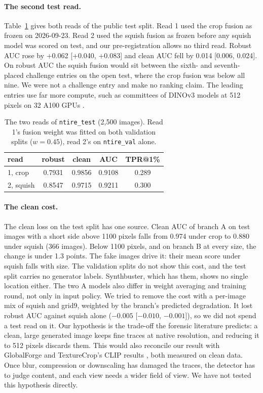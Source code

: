 \documentclass[letterpaper]{article} %
\begin{document}
\paragraph{The second test read.} Table~\ref{tab:test} gives both reads of
the public test split. Read 1 used the crop fusion as frozen on 2026-09-23.
Read 2 used the squish fusion as frozen before any squish model was scored on
test, and our pre-registration allows no third read. Robust AUC rose by
+0.062 [+0.040, +0.083] and clean AUC fell by 0.014 [0.006, 0.024]. On robust
AUC the squish fusion would sit between the sixth- and seventh-placed
challenge entries on the open test, where the crop fusion was below all nine.
We were not a challenge entry and make no ranking claim. The leading entries
use far more compute, such as committees of DINOv3 models at 512 pixels on 32
A100 GPUs \cite{gushchin2026ntire}.

\begin{table}[t]
\centering
\small
\begin{tabular}{lcccc}
\toprule
read & robust & clean & AUC & TPR@1\% \\
\midrule
1, crop & 0.7931 & 0.9856 & 0.9108 & 0.289 \\
2, squish & 0.8547 & 0.9715 & 0.9211 & 0.300 \\
\bottomrule
\end{tabular}
\caption{The two reads of \texttt{ntire\_test} (2,500 images). Read 1's fusion
weight was fitted on both validation splits ($w = 0.45$), read 2's on
\texttt{ntire\_val} alone.}
\label{tab:test}
\end{table}

\paragraph{The clean cost.} The clean loss on the test split has one source.
Clean AUC of branch A on test images with a short side above 1100 pixels
falls from 0.974 under crop to 0.880 under squish (366 images). Below 1100
pixels, and on branch B at every size, the change is under 1.3 points. The
fake images drive it: their mean score under squish falls with size. The
validation splits do not show this cost, and the test split carries no
generator labels. Synthbuster, which has them, shows no single location
either. The two A models also differ in weight averaging and training round,
not only in input policy. We tried to remove the cost with a per-image mix of
squish and grid9, weighted by the branch's predicted degradation. It lost
robust AUC against squish alone ($-0.005$ [$-0.010$, $-0.001$]), so we did
not spend a test read on it. Our hypothesis is the trade-off the forensic
literature predicts: a clean, large generated image keeps fine traces at
native resolution, and reducing it to 512 pixels discards them. This would
also reconcile our result with GlobalForge \cite{cui2026globalforge} and
TextureCrop's CLIP results \cite{konstantinidou2025texturecrop}, both
measured on clean data. Once blur, compression or downscaling has damaged the
traces, the detector has to judge content, and each view needs a wider field of
view. We have not tested this hypothesis directly.
\end{document}
